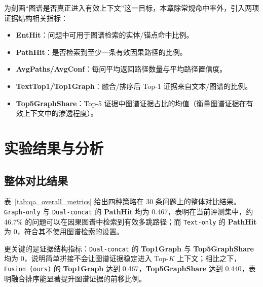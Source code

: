 为刻画“图谱是否真正进入有效上下文”这一目标，本章除常规命中率外，引入两项证据结构相关指标：
\begin{itemize}
  \item \textbf{EntHit}：问题中可用于图谱检索的实体/锚点命中比例。
  \item \textbf{PathHit}：是否检索到至少一条有效因果路径的比例。
  \item \textbf{AvgPaths/AvgConf}：每问平均返回路径数量与平均路径置信度。
  \item \textbf{TextTop1/Top1Graph}：融合/排序后 Top-1 证据来自文本/图谱的比例。
  \item \textbf{Top5GraphShare}：Top-5 证据中图谱证据占比的均值（衡量图谱证据在有效上下文中的渗透程度）。
\end{itemize}

\section{实验结果与分析}
\label{sec:results}

\subsection{整体对比结果}
\label{subsec:overall_results}

表~\ref{tab:qa_overall_metrics} 给出四种策略在 30 条问题上的整体对比结果。\texttt{Graph-only} 与 \texttt{Dual-concat} 的 \textbf{PathHit} 均为 0.467，表明在当前评测集中，约 46.7\% 的问题可以在因果图谱中检索到有效多跳路径；而 \texttt{Text-only} 的 \textbf{PathHit} 为 0，符合其不使用图谱检索的设置。

更关键的是证据结构指标：\texttt{Dual-concat} 的 \textbf{Top1Graph} 与 \textbf{Top5GraphShare} 均为 0，说明简单拼接不会让图谱证据稳定进入 Top-$K$ 上下文；相比之下，\texttt{Fusion (ours)} 的 \textbf{Top1Graph} 达到 0.467，\textbf{Top5GraphShare} 达到 0.440，表明融合排序能显著提升图谱证据的前移比例。


